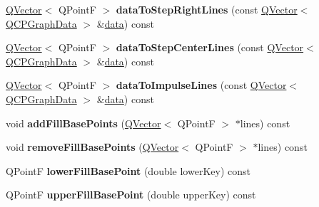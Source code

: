 \begin{DoxyCompactItemize}
\item 
\hyperlink{class_q_vector}{Q\+Vector}$<$ Q\+PointF $>$ {\bfseries data\+To\+Step\+Right\+Lines} (const \hyperlink{class_q_vector}{Q\+Vector}$<$ \hyperlink{class_q_c_p_graph_data}{Q\+C\+P\+Graph\+Data} $>$ \&\hyperlink{class_q_c_p_graph_a04514a2b1fb61a280ead66abe80b89ab}{data}) const \hypertarget{class_q_c_p_graph_a362c97e64451f9d77776893392774f42}{}\label{class_q_c_p_graph_a362c97e64451f9d77776893392774f42}

\item 
\hyperlink{class_q_vector}{Q\+Vector}$<$ Q\+PointF $>$ {\bfseries data\+To\+Step\+Center\+Lines} (const \hyperlink{class_q_vector}{Q\+Vector}$<$ \hyperlink{class_q_c_p_graph_data}{Q\+C\+P\+Graph\+Data} $>$ \&\hyperlink{class_q_c_p_graph_a04514a2b1fb61a280ead66abe80b89ab}{data}) const \hypertarget{class_q_c_p_graph_aa0b65abc3c6c7436cf5c701f3d43cd90}{}\label{class_q_c_p_graph_aa0b65abc3c6c7436cf5c701f3d43cd90}

\item 
\hyperlink{class_q_vector}{Q\+Vector}$<$ Q\+PointF $>$ {\bfseries data\+To\+Impulse\+Lines} (const \hyperlink{class_q_vector}{Q\+Vector}$<$ \hyperlink{class_q_c_p_graph_data}{Q\+C\+P\+Graph\+Data} $>$ \&\hyperlink{class_q_c_p_graph_a04514a2b1fb61a280ead66abe80b89ab}{data}) const \hypertarget{class_q_c_p_graph_a439c25428f367814ae1db875f6a6adcf}{}\label{class_q_c_p_graph_a439c25428f367814ae1db875f6a6adcf}

\item 
void {\bfseries add\+Fill\+Base\+Points} (\hyperlink{class_q_vector}{Q\+Vector}$<$ Q\+PointF $>$ $\ast$lines) const \hypertarget{class_q_c_p_graph_a259f6fc4d2568201abb5f1b69f1c2baf}{}\label{class_q_c_p_graph_a259f6fc4d2568201abb5f1b69f1c2baf}

\item 
void {\bfseries remove\+Fill\+Base\+Points} (\hyperlink{class_q_vector}{Q\+Vector}$<$ Q\+PointF $>$ $\ast$lines) const \hypertarget{class_q_c_p_graph_ae58eab7a1fd2ad104b0bec80cf6a30fd}{}\label{class_q_c_p_graph_ae58eab7a1fd2ad104b0bec80cf6a30fd}

\item 
Q\+PointF {\bfseries lower\+Fill\+Base\+Point} (double lower\+Key) const \hypertarget{class_q_c_p_graph_a41f982e8ceaefe6a53eb7432f26d64b6}{}\label{class_q_c_p_graph_a41f982e8ceaefe6a53eb7432f26d64b6}

\item 
Q\+PointF {\bfseries upper\+Fill\+Base\+Point} (double upper\+Key) const \hypertarget{class_q_c_p_graph_a363d066c179e0f46cc93c12bafb0bfba}{}\label{class_q_c_p_graph_a363d066c179e0f46cc93c12bafb0bfba}


\end{DoxyCompactItemize}
